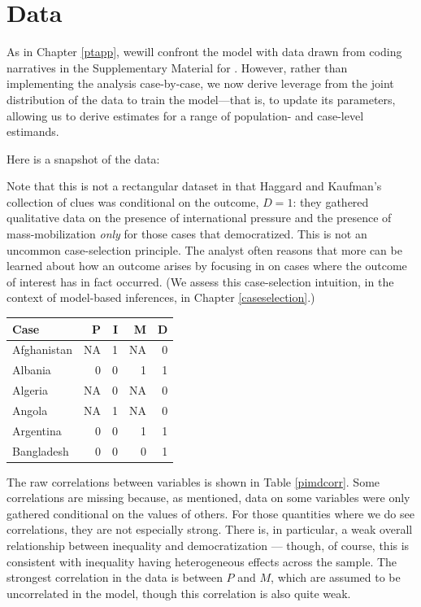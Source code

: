 \documentclass[12pt,]{book}
\begin{document}
\hypertarget{data}{%
\section{Data}\label{data}}

As in Chapter \ref{ptapp}, wewill confront the model with data drawn from coding narratives in the Supplementary Material for \citet{haggard2012inequality}. However, rather than implementing the analysis case-by-case, we now derive leverage from the joint distribution of the data to train the model---that is, to update its parameters, allowing us to derive estimates for a range of population- and case-level estimands.

Here is a snapshot of the data:

Note that this is not a rectangular dataset in that Haggard and Kaufman's collection of clues was conditional on the outcome, \(D=1\): they gathered qualitative data on the presence of international pressure and the presence of mass-mobilization \emph{only} for those cases that democratized. This is not an uncommon case-selection principle. The analyst often reasons that more can be learned about how an outcome arises by focusing in on cases where the outcome of interest has in fact occurred. (We assess this case-selection intuition, in the context of model-based inferences, in Chapter \ref{caseselection}.)

\begin{tabular}{l|r|r|r|r}
\hline
Case & P & I & M & D\\
\hline
Afghanistan & NA & 1 & NA & 0\\
\hline
Albania & 0 & 0 & 1 & 1\\
\hline
Algeria & NA & 0 & NA & 0\\
\hline
Angola & NA & 1 & NA & 0\\
\hline
Argentina & 0 & 0 & 1 & 1\\
\hline
Bangladesh & 0 & 0 & 0 & 1\\
\hline
\end{tabular}

The raw correlations between variables is shown in Table \ref{pimdcorr}. Some correlations are missing because, as mentioned, data on some variables were only gathered conditional on the values of others. For those quantities where we do see correlations, they are not especially strong. There is, in particular, a weak overall relationship between inequality and democratization --- though, of course, this is consistent with inequality having heterogeneous effects across the sample. The strongest correlation in the data is between \(P\) and \(M\), which are assumed to be uncorrelated in the model, though this correlation is also quite weak.
\end{document}
